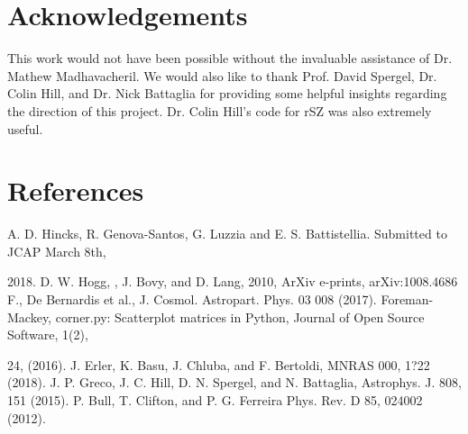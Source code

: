 \documentclass{princeton_astro_thesis}
\begin{document}
\chapter{Acknowledgements}
This work would not have been possible without the invaluable assistance of Dr. Mathew Madhavacheril. We would also like to thank Prof. David Spergel,  Dr. Colin Hill, and Dr. Nick Battaglia for providing some helpful insights regarding the direction of this project.   Dr. Colin Hill's code for rSZ was also extremely useful. 

\chapter{References}
A. D. Hincks, R. Genova-Santos, G. Luzzia and E. S. Battistellia. Submitted to JCAP March 8th, \par 2018. \newline
D. W. Hogg, , J. Bovy,  and D. Lang,  2010, ArXiv e-prints, arXiv:1008.4686 \newline
F., De Bernardis et al., J. Cosmol. Astropart. Phys. 03 008 (2017). \newline
Foreman-Mackey, corner.py: Scatterplot matrices in Python, Journal of Open Source Software, 1(2), \par 24, (2016).\newline
J. Erler, K. Basu, J. Chluba, and F. Bertoldi, MNRAS 000, 1?22 (2018).
J. P. Greco, J. C. Hill, D. N. Spergel, and N. Battaglia,
Astrophys. J. 808, 151 (2015). \newline
P. Bull, T. Clifton, and P. G. Ferreira Phys. Rev. D 85, 024002 (2012). \newline
\end{document}
